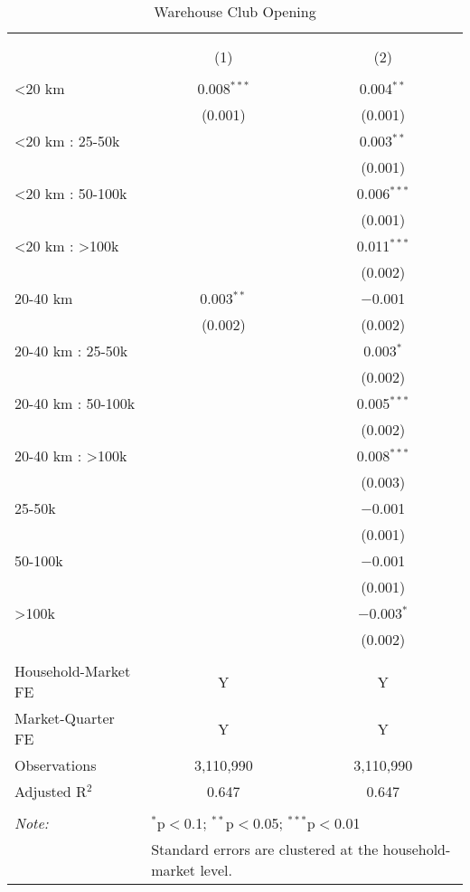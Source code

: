 
\begin{table}[!htbp] \centering 
  \caption{Warehouse Club Opening} 
  \label{tab:clubOpening} 
\begin{tabular}{@{\extracolsep{5pt}}lcc} 
\\[-1.8ex]\hline 
\hline \\[-1.8ex] 
\\[-1.8ex] & (1) & (2)\\ 
\hline \\[-1.8ex] 
 <20 km & 0.008$^{***}$ & 0.004$^{**}$ \\ 
  & (0.001) & (0.001) \\ 
  <20 km : 25-50k &  & 0.003$^{**}$ \\ 
  &  & (0.001) \\ 
  <20 km : 50-100k &  & 0.006$^{***}$ \\ 
  &  & (0.001) \\ 
  <20 km : >100k &  & 0.011$^{***}$ \\ 
  &  & (0.002) \\ 
  20-40 km & 0.003$^{**}$ & $-$0.001 \\ 
  & (0.002) & (0.002) \\ 
  20-40 km : 25-50k &  & 0.003$^{*}$ \\ 
  &  & (0.002) \\ 
  20-40 km : 50-100k &  & 0.005$^{***}$ \\ 
  &  & (0.002) \\ 
  20-40 km : >100k &  & 0.008$^{***}$ \\ 
  &  & (0.003) \\ 
  25-50k &  & $-$0.001 \\ 
  &  & (0.001) \\ 
  50-100k &  & $-$0.001 \\ 
  &  & (0.001) \\ 
  >100k &  & $-$0.003$^{*}$ \\ 
  &  & (0.002) \\ 
 \hline \\[-1.8ex] 
Household-Market FE & Y & Y \\ 
Market-Quarter FE & Y & Y \\ 
Observations & 3,110,990 & 3,110,990 \\ 
Adjusted R$^{2}$ & 0.647 & 0.647 \\ 
\hline 
\hline \\[-1.8ex] 
\textit{Note:}  & \multicolumn{2}{l}{$^{*}$p$<$0.1; $^{**}$p$<$0.05; $^{***}$p$<$0.01} \\ 
 & \multicolumn{2}{l}{Standard errors are clustered at the household-market level.} \\ 
\end{tabular} 
\end{table} 
